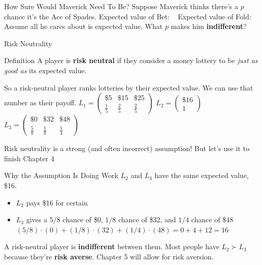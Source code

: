 \begin{frame}{How Sure Would Maverick Need To Be?}
Suppose Maverick thinks there's a $p$ chance it's the Ace of Spades.
\bsk
Expected value of Bet: \ 
\bsk
Expected value of Fold: \ 
\bsk
Assume all he cares about is expected value. What $p$ makes him \textbf{indifferent}?
\bsk
{}
\vfill
{}
\vspace{-0.2in}
\end{frame}

\begin{frame}{Risk Neutrality}
\begin{block}{Definition}
A player is \textbf{risk neutral} if they consider a money lottery to be
\textit{just as good as} its expected value.
\end{block}
\bsk
So a risk-neutral player ranks lotteries by their expected value. We can use
that number as their payoff.
\bsk
\centering
$L_1=\begin{pmatrix} \$5 & \$15 & \$25 \\[2pt] \tfrac{1}{5} & \tfrac{2}{5} & \tfrac{2}{5}\end{pmatrix}$
\hspace{0.2in}
$L_2=\begin{pmatrix} \$16 \\[2pt] 1\end{pmatrix}$
\hspace{0.2in}
$L_3=\begin{pmatrix} \$0 & \$32 & \$48 \\[2pt] \tfrac{5}{8} & \tfrac{1}{8} & \tfrac{1}{4}\end{pmatrix}$
\bsk
\raggedright
\vspace{1in}
{\footnotesize Risk neutrality is a strong (and often incorrect) assumption! But let's use it to finish Chapter 4}
\vspace{-0.2in}
\end{frame}

\begin{frame}{Why the Assumption Is Doing Work}
$L_2$ and $L_3$ have the same expected value, \$16.
\bsk
\begin{itemize}
    \item $L_2$ pays \$16 for certain
    \item $L_3$ gives a $5/8$ chance of \$0, $1/8$ chance of \$32, and $1/4$ chance of \$48\\
    $(5/8)\cdot(0)+(1/8)\cdot(32)+(1/4)\cdot(48) = 0 + 4 + 12 = 16$
\end{itemize}
\bsk
A risk-neutral player is \textbf{indifferent} between them.
\vfill
Most people have $L_2\succ L_3$ because they're \textbf{risk averse}.
\bsk
Chapter 5 will allow for risk aversion.
\vspace{-0.4in}
\end{frame}

